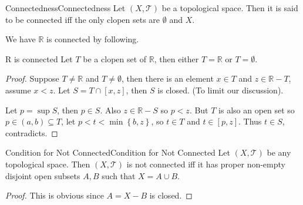 \documentclass[../main.tex]{subfiles}
\begin{document}
\begin{definition}{Connectedness}{Connectedness}
Let $(X,\mathcal{T})$ be a topological space. Then it is said to be connected iff the only clopen sets are $\emptyset $ and $X$.
\end{definition}

We have $\mathbb{R}$ is connected by following.

\begin{proposition}{}{R is connected}
Let $T$ be a clopen set of $\mathbb{R}$, then either $T=\mathbb{R}$ or $T=\emptyset $.
\end{proposition}
\begin{proof}
	Suppose $T\neq \mathbb{R}$ and $T\neq \emptyset $, then there is an element $x\in T$ and $z\in \mathbb{R}-T$, assume $x<z$. Let $S=T\cap [x,z]$, then $S$ is closed. (To limit our discussion).

	Let $p = \sup S$, then $p\in S$. Also $z\in \mathbb{R}-S$ so $p<z$. But $T$ is also an open set so $p\in (a,b) \subseteq T$, let $p<t<\min \left\{ b,z \right\}$, so $t\in T$ and $t\in [p,z]$. Thus $t\in S$, contradicts.
\end{proof}

\begin{theorem}{Condition for Not Connected}{Condition for Not Connected}
Let $(X,\mathcal{T})$ be any topological space. Then $(X,\mathcal{T})$ is not connected iff it has proper non-empty disjoint open subsets $A,B$ such that $X = A\cup B$.
\end{theorem}
\begin{proof}
This is obvious since $A = X-B$ is closed.
\end{proof}
\end{document}
